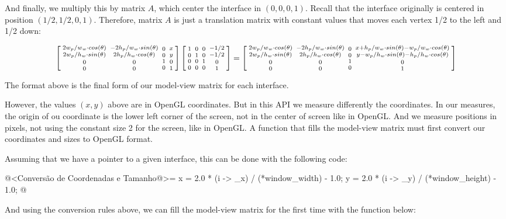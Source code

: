 And finally, we multiply this by matrix $A$, which center the
interface in $(0, 0, 0, 1)$. Recall that the interface originally is
centered in position $(1/2, 1/2, 0, 1)$. Therefore, matrix $A$ is just
a translation matrix with constant values that moves each vertex 1/2
to the left and 1/2 down:

$$
\left[{{2w_p/w_w\cdot cos(\theta) \atop 2w_p/h_w\cdot sin(\theta)}
\atop {0\atop 0}}
  {{-2h_p/w_w\cdot sin(\theta) \atop 2h_p/h_w\cdot cos(\theta)}\atop
  {0 \atop 0}} {{0\atop 0}\atop{1 \atop 0}} {{x \atop y}\atop{0\atop
  1}}\right]
\left[{{1 \atop 0}\atop {0\atop 0}}{{0 \atop 1}\atop {0 \atop
      0}}{{0\atop 0}\atop{1 \atop 0}}{{-1/2 \atop -1/2}\atop{0\atop
      1}}\right]=

\left[{{2w_p/w_w\cdot cos(\theta) \atop 2w_p/h_w\cdot sin(\theta)}
\atop {0\atop 0}}
  {{-2h_p/w_w\cdot sin(\theta) \atop 2h_p/h_w\cdot cos(\theta)}\atop
  {0 \atop 0}} {{0\atop 0}\atop{1 \atop 0}} {{x+h_p/w_w\cdot
  sin(\theta)-w_p/w_w\cdot cos(\theta) \atop y-w_p/h_w\cdot
  sin(\theta)-h_p/h_w\cdot cos(\theta)}\atop{0\atop 1}}\right]
$$

The format above is the final form of our model-view matrix for each
interface.

However, the values $(x, y)$ above are in OpenGL coordinates. But in
this API we measure differently the coordinates. In our measures, the
origin of ou coordinate is the lower left corner of the screen, not in
the center of screen like in OpenGL. And we measure positions in
pixels, not using the constant size 2 for the screen, like in
OpenGL. A function that fills the model-view matrix must first convert
our coordinates and sizes to OpenGL format.

Assuming that we have a pointer  to a given interface,
this can be done with the following code:

\iniciocodigo
@<Conversão de Coordenadas e Tamanho@>=
x = 2.0 * (i -> _x) / (*window_width) - 1.0;
y = 2.0 * (i -> _y) / (*window_height) - 1.0;
@
\fimcodigo

And using the conversion rules above, we can fill the model-view
matrix for the first time with the function below:

